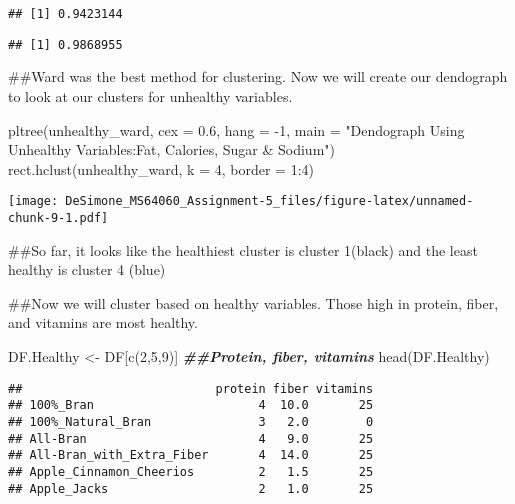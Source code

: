 \documentclass[
]{article}
\newenvironment{Shaded}{\begin{snugshade}}{\end{snugshade}}
\newcommand{\AttributeTok}[1]{\textcolor[rgb]{0.77,0.63,0.00}{#1}}
\newcommand{\DecValTok}[1]{\textcolor[rgb]{0.00,0.00,0.81}{#1}}
\newcommand{\DocumentationTok}[1]{\textcolor[rgb]{0.56,0.35,0.01}{\textbf{\textit{#1}}}}
\newcommand{\FloatTok}[1]{\textcolor[rgb]{0.00,0.00,0.81}{#1}}
\newcommand{\FunctionTok}[1]{\textcolor[rgb]{0.00,0.00,0.00}{#1}}
\newcommand{\NormalTok}[1]{#1}
\newcommand{\OtherTok}[1]{\textcolor[rgb]{0.56,0.35,0.01}{#1}}
\newcommand{\SpecialCharTok}[1]{\textcolor[rgb]{0.00,0.00,0.00}{#1}}
\newcommand{\StringTok}[1]{\textcolor[rgb]{0.31,0.60,0.02}{#1}}
\begin{document}
\begin{verbatim}
## [1] 0.9423144
\end{verbatim}

\begin{Shaded}
\end{Shaded}

\begin{verbatim}
## [1] 0.9868955
\end{verbatim}

\#\#Ward was the best method for clustering. Now we will create our
dendograph to look at our clusters for unhealthy variables.

\begin{Shaded}
\begin{Highlighting}[]
\FunctionTok{pltree}\NormalTok{(unhealthy\_ward, }\AttributeTok{cex =} \FloatTok{0.6}\NormalTok{, }\AttributeTok{hang =} \SpecialCharTok{{-}}\DecValTok{1}\NormalTok{, }\AttributeTok{main =} \StringTok{"Dendograph Using Unhealthy Variables:Fat, Calories, Sugar \& Sodium"}\NormalTok{)}
\FunctionTok{rect.hclust}\NormalTok{(unhealthy\_ward, }\AttributeTok{k =} \DecValTok{4}\NormalTok{, }\AttributeTok{border =} \DecValTok{1}\SpecialCharTok{:}\DecValTok{4}\NormalTok{)}
\end{Highlighting}
\end{Shaded}

\texttt{[image: DeSimone\_MS64060\_Assignment-5\_files/figure-latex/unnamed-chunk-9-1.pdf]}

\#\#So far, it looks like the healthiest cluster is cluster 1(black) and
the least healthy is cluster 4 (blue)

\#\#Now we will cluster based on healthy variables. Those high in
protein, fiber, and vitamins are most healthy.

\begin{Shaded}
\begin{Highlighting}[]
\NormalTok{DF.Healthy }\OtherTok{\textless{}{-}}\NormalTok{ DF[}\FunctionTok{c}\NormalTok{(}\DecValTok{2}\NormalTok{,}\DecValTok{5}\NormalTok{,}\DecValTok{9}\NormalTok{)] }\DocumentationTok{\#\#Protein, fiber, vitamins}
\FunctionTok{head}\NormalTok{(DF.Healthy)}
\end{Highlighting}
\end{Shaded}

\begin{verbatim}
##                           protein fiber vitamins
## 100%_Bran                       4  10.0       25
## 100%_Natural_Bran               3   2.0        0
## All-Bran                        4   9.0       25
## All-Bran_with_Extra_Fiber       4  14.0       25
## Apple_Cinnamon_Cheerios         2   1.5       25
## Apple_Jacks                     2   1.0       25
\end{verbatim}
\end{document}
